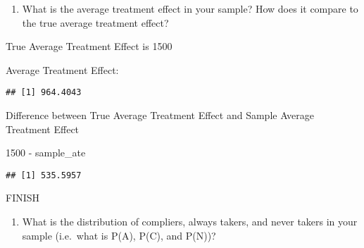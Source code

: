 \documentclass[
]{article}
\newenvironment{Shaded}{\begin{snugshade}}{\end{snugshade}}
\newcommand{\DecValTok}[1]{\textcolor[rgb]{0.00,0.00,0.81}{#1}}
\newcommand{\FunctionTok}[1]{\textcolor[rgb]{0.00,0.00,0.00}{#1}}
\newcommand{\NormalTok}[1]{#1}
\newcommand{\OtherTok}[1]{\textcolor[rgb]{0.56,0.35,0.01}{#1}}
\newcommand{\SpecialCharTok}[1]{\textcolor[rgb]{0.00,0.00,0.00}{#1}}
\newcommand{\StringTok}[1]{\textcolor[rgb]{0.31,0.60,0.02}{#1}}
\providecommand{\tightlist}{%
  \setlength{\itemsep}{0pt}\setlength{\parskip}{0pt}}
\begin{document}
\begin{enumerate}
\def\labelenumi{\arabic{enumi}.}
\tightlist
\item
  What is the average treatment effect in your sample? How does it
  compare to the true average treatment effect?
\end{enumerate}

True Average Treatment Effect is 1500

Average Treatment Effect:

\begin{Shaded}
\end{Shaded}

\begin{verbatim}
## [1] 964.4043
\end{verbatim}

Difference between True Average Treatment Effect and Sample Average
Treatment Effect

\begin{Shaded}
\begin{Highlighting}[]
\DecValTok{1500} \SpecialCharTok{{-}}\NormalTok{ sample\_ate}
\end{Highlighting}
\end{Shaded}

\begin{verbatim}
## [1] 535.5957
\end{verbatim}

FINISH

\begin{enumerate}
\def\labelenumi{\arabic{enumi}.}
\setcounter{enumi}{1}
\tightlist
\item
  What is the distribution of compliers, always takers, and never takers
  in your sample (i.e.~what is P(A), P(C), and P(N))?
\end{enumerate}
\end{document}
